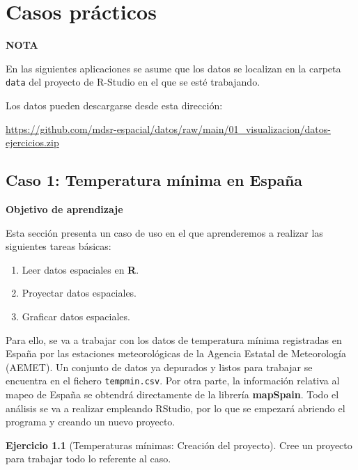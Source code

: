 \documentclass[
]{book}
\theoremstyle{definition}
\theoremstyle{definition}
\theoremstyle{definition}
\newtheorem{exercise}{Ejercicio}[chapter]
\theoremstyle{definition}
\theoremstyle{remark}
\begin{document}
\hypertarget{casos}{%
\chapter{Casos prácticos}\label{casos}}

\begin{infobox}
\textbf{NOTA}

En las siguientes aplicaciones se asume que los datos se localizan en la carpeta
\texttt{data} del proyecto de R-Studio en el que se esté trabajando.

Los datos pueden descargarse desde esta dirección:

\url{https://github.com/mdsr-espacial/datos/raw/main/01_visualizacion/datos-ejercicios.zip}

\end{infobox}

\hypertarget{tempmin}{%
\section{Caso 1: Temperatura mínima en España}\label{tempmin}}

\textbf{Objetivo de aprendizaje}

Esta sección presenta un caso de uso en el que aprenderemos a realizar las
siguientes tareas básicas:

\begin{enumerate}
\def\labelenumi{\arabic{enumi}.}
\item
  Leer datos espaciales en \textbf{R}.
\item
  Proyectar datos espaciales.
\item
  Graficar datos espaciales.
\end{enumerate}

Para ello, se va a trabajar con los datos de temperatura mínima registradas en
España por las estaciones meteorológicas de la Agencia Estatal de Meteorología
(AEMET). Un conjunto de datos ya depurados y listos para trabajar se encuentra
en el fichero \texttt{tempmin.csv}. Por otra parte, la información relativa al mapeo de
España se obtendrá directamente de la librería \textbf{mapSpain}. Todo el análisis se
va a realizar empleando RStudio, por lo que se empezará abriendo el programa y
creando un nuevo proyecto.

\begin{exercise}[Temperaturas mínimas: Creación del proyecto]
\protect\hypertarget{exr:ex-crea}{}\label{exr:ex-crea}Cree un proyecto para trabajar todo lo referente al caso.
\end{exercise}
\end{document}
